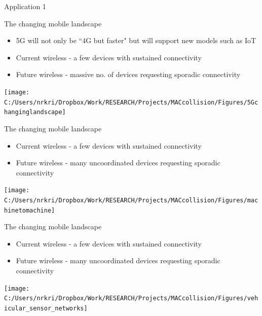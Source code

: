\begin{frame}{Application 1}
\end{frame}
\begin{frame}{The changing mobile landscape}
\begin{block}{}
\begin{itemize}
\item 5G will not only be ``4G but faster" but will support new models such as IoT
\item Current wireless - a few devices with sustained connectivity
\item Future wireless -  \alert{massive} no. of devices requesting \alert{sporadic} connectivity
\end{itemize}
\end{block}
\begin{center}
\texttt{[image: C:/Users/nrkri/Dropbox/Work/RESEARCH/Projects/MACcollision/Figures/5Gchanginglandscape]}
\end{center}
\end{frame}
\begin{frame}{The changing mobile landscape}
\begin{block}{}
\begin{itemize}
\item Current wireless - a few devices with sustained connectivity
\item Future wireless -  \alert{many uncoordinated} devices requesting \alert{sporadic} connectivity
\end{itemize}
\end{block}
\begin{center}
\texttt{[image: C:/Users/nrkri/Dropbox/Work/RESEARCH/Projects/MACcollision/Figures/machinetomachine]}
\end{center}
\end{frame}
\begin{frame}{The changing mobile landscape}
\begin{block}{}
\begin{itemize}
\item Current wireless - a few devices with sustained connectivity
\item Future wireless -  \alert{many uncoordinated} devices requesting \alert{sporadic} connectivity
\end{itemize}
\end{block}
\begin{center}
\texttt{[image: C:/Users/nrkri/Dropbox/Work/RESEARCH/Projects/MACcollision/Figures/vehicular\_sensor\_networks]}
\end{center}
\end{frame}
